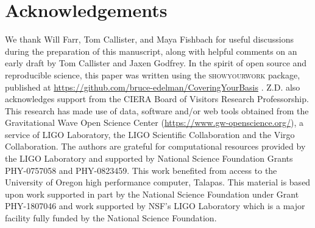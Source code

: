 \documentclass[twocolumn]{aastex631}
\begin{document}








\section{Acknowledgements}\label{sec:acknowledments}
We thank Will Farr, Tom Callister, and Maya Fishbach for useful discussions during the preparation of this manuscript, 
along with helpful comments on an early draft by Tom Callister and Jaxen Godfrey. In the spirit of open source and reproducible science, this paper was written using the \textsc{showyourwork} package, published at \url{https://github.com/bruce-edelman/CoveringYourBasis} \citep{Luger2021}. Z.D. also acknowledges support from the CIERA Board
of Visitors Research Professorship. This research has made use of data, software and/or web tools obtained from the Gravitational Wave Open Science Center 
(\url{https://www.gw-openscience.org/}), a service of LIGO Laboratory, the LIGO Scientific Collaboration and the Virgo Collaboration. 
The authors are grateful for computational resources provided by the LIGO Laboratory and supported by National Science Foundation Grants PHY-0757058 and PHY-0823459.  
This work benefited from access to the University of Oregon high performance computer, Talapas. This material is based upon work supported 
in part by the National Science Foundation under Grant PHY-1807046 and work supported by NSF's LIGO Laboratory which is a major facility 
fully funded by the National Science Foundation.
{}



\end{document}

